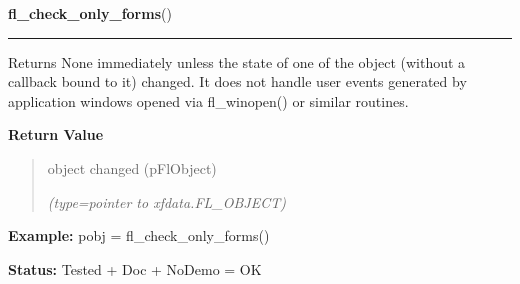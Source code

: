 \hspace{.8\funcindent}\begin{boxedminipage}{\funcwidth}

    \raggedright \textbf{fl\_check\_only\_forms}()

    \vspace{-1.5ex}

    \rule{\textwidth}{0.5\fboxrule}
\setlength{\parskip}{2ex}
    Returns None immediately unless the state of one of the object (without
    a callback bound to it) changed. It does not handle user events 
    generated by application windows opened via fl\_winopen() or similar 
    routines.

\setlength{\parskip}{1ex}
      \textbf{Return Value}
    \vspace{-1ex}

      \begin{quote}
      object changed (pFlObject)

      {\it (type=pointer to xfdata.FL\_OBJECT)}

      \end{quote}

\textbf{Example:} pobj = fl\_check\_only\_forms()



\textbf{Status:} Tested + Doc + NoDemo = OK



    \end{boxedminipage}

    \label{xformslib:flbasic:fl_freeze_form}

    \vspace{0.5ex}

